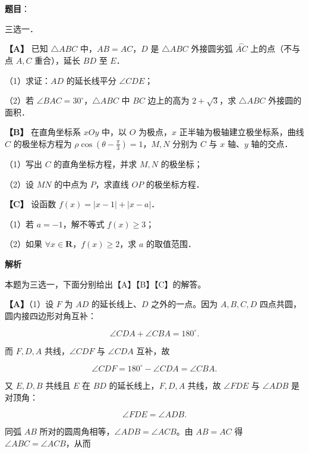 \begin{answer}

\textbf{题目}：

三选一．

\textbf{【A】} 已知 $\triangle ABC$ 中，$AB=AC$，$D$ 是 $\triangle ABC$ 外接圆劣弧 $\overset{\frown}{AC}$ 上的点（不与点 $A,C$ 重合），延长 $BD$ 至 $E$．

（1）求证：$AD$ 的延长线平分 $\angle CDE$；

（2）若 $\angle BAC=30^\circ$，$\triangle ABC$ 中 $BC$ 边上的高为 $2+\sqrt3$，求 $\triangle ABC$ 外接圆的面积．

\textbf{【B】} 在直角坐标系 $xOy$ 中，以 $O$ 为极点，$x$ 正半轴为极轴建立极坐标系，曲线 $C$ 的极坐标方程为 $\rho\cos\left(\theta-\frac{\pi}{3}\right)=1$，$M,N$ 分别为 $C$ 与 $x$ 轴、$y$ 轴的交点．

（1）写出 $C$ 的直角坐标方程，并求 $M,N$ 的极坐标；

（2）设 $MN$ 的中点为 $P$，求直线 $OP$ 的极坐标方程．

\textbf{【C】} 设函数 $f(x)=|x-1|+|x-a|$．

（1）若 $a=-1$，解不等式 $f(x)\geqslant3$；

（2）如果 $\forall x\in\mathbf R$，$f(x)\geqslant2$，求 $a$ 的取值范围．
\nopagebreak[4]
\begin{center}\end{center}
\nopagebreak[4]
\textbf{解析}

本题为三选一，下面分别给出【A】【B】【C】的解答。

\textbf{【A】}（1）设 $F$ 为 $AD$ 的延长线上、$D$ 之外的一点。因为 $A,B,C,D$ 四点共圆，圆内接四边形对角互补：

\nopagebreak[4]
\[\angle CDA+\angle CBA=180^\circ .\]

而 $F,D,A$ 共线，$\angle CDF$ 与 $\angle CDA$ 互补，故

\nopagebreak[4]
\[\angle CDF=180^\circ-\angle CDA=\angle CBA .\]

又 $E,D,B$ 共线且 $E$ 在 $BD$ 的延长线上，$F,D,A$ 共线，故 $\angle FDE$ 与 $\angle ADB$ 是对顶角：

\nopagebreak[4]
\[\angle FDE=\angle ADB .\]

同弧 $AB$ 所对的圆周角相等，$\angle ADB=\angle ACB$。由 $AB=AC$ 得 $\angle ABC=\angle ACB$，从而


\end{answer}
